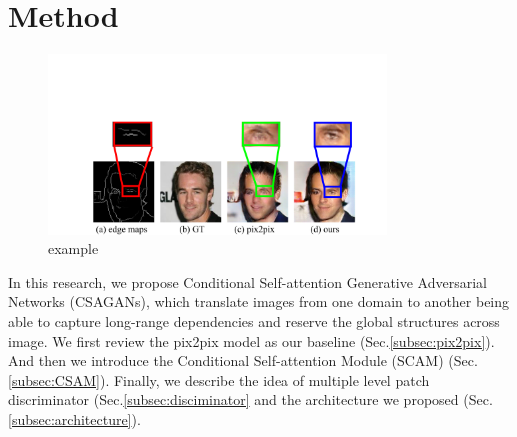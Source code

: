 \section{Method}
\label{sec:method}

%
\begin{figure}
	\includegraphics[width=0.8\textwidth]{figures/example}
	\caption{example}
	\label{fig:example}
\end{figure}
%
In this research, we propose Conditional Self-attention Generative Adversarial Networks (CSAGANs), which translate images from one domain to another being able to capture long-range dependencies and reserve the global structures across image. We first review the pix2pix model as our baseline (Sec.\ref{subsec:pix2pix}). And then we introduce the Conditional Self-attention Module (SCAM) (Sec. \ref{subsec:CSAM}). Finally, we describe the idea of multiple level patch discriminator (Sec.\ref{subsec:disciminator} and the architecture we proposed (Sec. \ref{subsec:architecture}).
